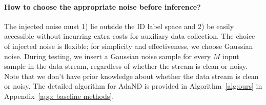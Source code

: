 \vspace{-5pt}
\paragraph{How to choose the appropriate noise before inference?}
The injected noise must 1) lie outside the ID label space and 2) be easily accessible without incurring extra costs for auxiliary data collection. The choice of injected noise is flexible; for simplicity and effectiveness, we choose Gaussian noise. 
During testing, we insert a Gaussian noise sample for every $M$ input sample in the data stream, regardless of whether the stream is clean or noisy. Note that we don't have prior knowledge about whether the data stream is clean or noisy.
The detailed algorithm for AdaND is provided in Algorithm~\ref{alg:ours} in Appendix~\ref{app: baseline methods}.





